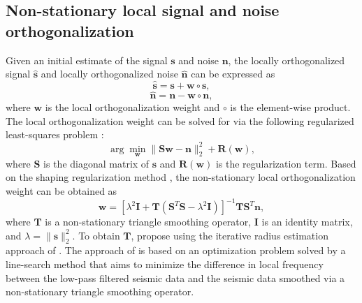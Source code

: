 \subsection{Non-stationary local signal and noise orthogonalization}
Given an initial estimate of the signal $\mathbf{s}$ and noise $\mathbf{n}$, the locally orthogonalized signal $\mathbf{\hat{s}}$ and locally orthogonalized noise $\mathbf{\hat{n}}$ can be expressed as
\begin{equation}
\mathbf{\hat{s}} = \mathbf{s} + \mathbf{w}\circ\mathbf{s},
\label{eq:orthosignal}
\end{equation}
\begin{equation}
\mathbf{\hat{n}} = \mathbf{n} - \mathbf{w}\circ\mathbf{n},
\label{eq:orthonoise}
\end{equation}
where $\mathbf{w}$ is the local orthogonalization weight \cite[]{chenfomel2015} and $\circ$ is the element-wise product. 
The local orthogonalization weight can be solved for via the following regularized least-squares problem \cite[]{chenfomelorthon2021}:
\begin{equation}
\arg \min_{\mathbf{w}} \parallel  \mathbf{S}\mathbf{w} - \mathbf{n} \parallel_2^2 + \mathbf{R}(\mathbf{w}),
\label{eq:weight}
\end{equation}
where $\mathbf{S}$ is the diagonal matrix of $\mathbf{{s}}$  and $\mathbf{R(w)}$ is the regularization term. 
Based on the shaping regularization method \cite[]{fomel2007b}, the non-stationary local orthogonalization weight can be obtained as 
\begin{equation}
\mathbf{w} = [\lambda^2 \mathbf{I} + \mathbf{T} (\mathbf{S}^T\mathbf{S} -\lambda^2 \mathbf{I})]^{-1}\mathbf{T}\mathbf{S}^T\mathbf{n},
\label{eq:weightsol}
\end{equation}
where $\mathbf{T}$ is a non-stationary triangle smoothing operator, $\mathbf{I}$ is an identity matrix, and $\lambda=\parallel\mathbf{s}\parallel^2_2$. 
To obtain $\mathbf{T}$, \cite{chenfomelorthon2021} propose using the iterative radius estimation approach of \cite{greerfomel2018}. 
The approach of \cite{greerfomel2018} is based on an optimization problem solved by a line-search method that aims to minimize the difference in local frequency between the low-pass filtered seismic data and the seismic data smoothed via a non-stationary triangle smoothing operator. 
